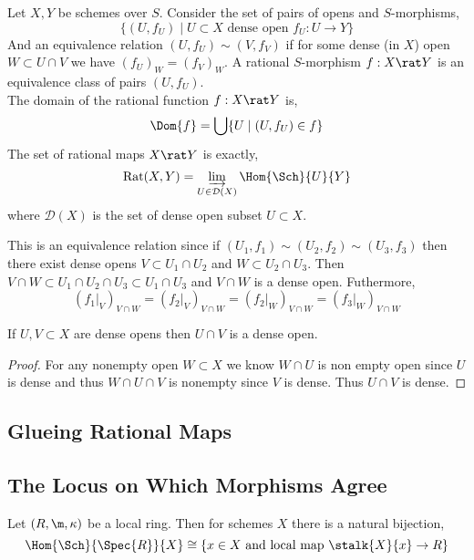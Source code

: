 \documentclass[12pt]{article}
\begin{document}
\begin{definition}
Let $X, Y$ be schemes over $S$. Consider the set of pairs of opens and $S$-morphisms,
\[ \{ (U, f_U) \mid U \subset X \text{ dense open } f_U : U \to Y \} \]
And an equivalence relation $(U, f_U) \sim (V, f_V)$ if for some dense (in $X$) open $W \subset U \cap V$ we have $(f_U)_{W} = (f_V)_{W}$. A rational $S$-morphism $f : X \rat Y$ is an equivalence class of pairs $(U, f_U)$. 
\bigskip\\
The domain of the rational function $f : X \rat Y$ is,
\[ \Dom{f} = \bigcup \{ U \mid (U, f_U) \in f \} \]
The set of rational maps $X \rat Y$ is exactly,
\[ \mathrm{Rat}(X, Y) = \varinjlim_{U \in \mathcal{D}(X)} \Hom{\Sch}{U}{Y} \]
where $\mathcal{D}(X)$ is the set of dense open subset $U \subset X$.
\end{definition}

\begin{remark}
This is an equivalence relation since if $(U_1, f_1) \sim (U_2, f_2) \sim (U_3, f_3)$ then there exist dense opens $V \subset U_1 \cap U_2$ and $W \subset U_2 \cap U_3$. Then $V \cap W \subset U_1 \cap U_2 \cap U_3 \subset U_1 \cap U_3$ and $V \cap W$ is a dense open. Futhermore,
\[ (f_1|_{V})_{V \cap W} = (f_2|_{V})_{V \cap W} = (f_2|_{W})_{V \cap W} = (f_3|_{W})_{V \cap W} \]
\end{remark}

\begin{lemma}
If $U, V \subset X$ are dense opens then $U \cap V$ is a dense open.
\end{lemma}

\begin{proof}
For any nonempty open $W \subset X$ we know $W \cap U$ is non empty open since $U$ is dense and thus $W \cap U \cap V$ is nonempty since $V$ is dense. Thus $U \cap V$ is dense. 
\end{proof}

\subsection{Glueing Rational Maps}

\subsection{The Locus on Which Morphisms Agree}

\begin{lemma}
Let $(R, \m, \kappa)$ be a local ring. Then for schemes $X$ there is a natural bijection,
\[ \Hom{\Sch}{\Spec{R}}{X} \cong \{ x \in X \text{ and local map } \stalk{X}{x} \to R \} \]
\end{lemma}
\end{document}

